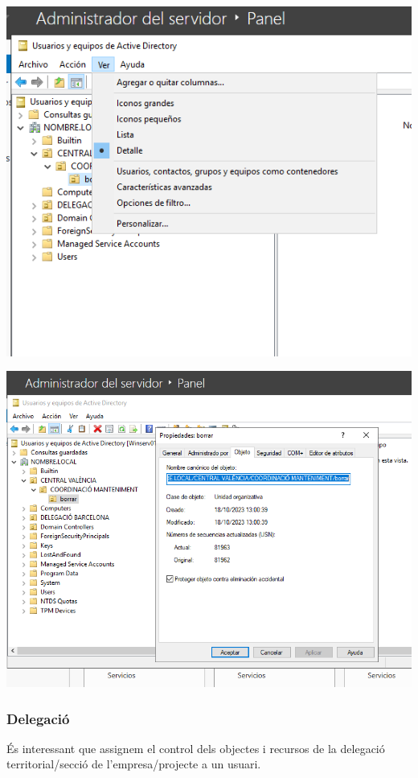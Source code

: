 \documentclass[
  a4paper,
]{article}
\begin{document}
\includegraphics{png/uoVerCaracteristicasAvanzadas.png}

\includegraphics{png/uoProtegerContraEliminacion.png}

\subsubsection{Delegació}\label{delegaciuxf3}

És interessant que assignem el control dels objectes i recursos de la
delegació territorial/secció de l'empresa/projecte a un usuari.
\end{document}
